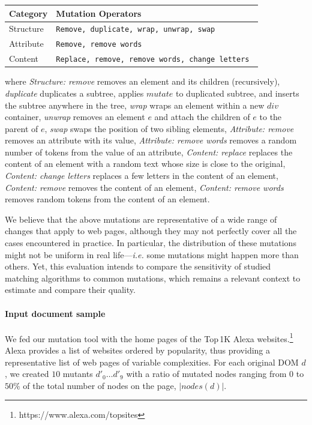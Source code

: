 \begin{center}
    \begin{table}[h]
    \begin{tabular}{l|l}
    \hline
    Category  & Mutation Operators                       \\ \hline
    Structure & \tt Remove, duplicate, wrap, unwrap, swap    \\
    Attribute & \tt Remove, remove words                     \\
    Content   & \tt Replace, remove, remove words, change letters \\ \hline
    \end{tabular}
    \end{table}
\end{center}
where
\textit{Structure: remove} removes an element and its children (recursively), 
\textit{duplicate} duplicates a subtree, applies $mutate$ to duplicated subtree, and inserts the subtree anywhere in the tree,
\textit{wrap} wraps an element within a new $div$ container,
\textit{unwrap} removes an element $e$ and attach the children of $e$ to the parent of $e$,
\textit{swap} swaps the position of two sibling elements,
\textit{Attribute: remove} removes an attribute with its value,
\textit{Attribute: remove words} removes a random number of tokens from the value of an attribute,
\textit{Content: replace} replaces the content of an element with a random text whose size is close to the original,
\textit{Content: change letters} replaces a few letters in the content of an element,
\textit{Content: remove} removes the content of an element,
\textit{Content: remove words} removes random tokens from the content of an element.

We believe that the above mutations are representative of a wide range of changes that apply to web pages, although they may not perfectly cover all the cases encountered in practice.
In particular, the distribution of these mutations might not be uniform in real life---\emph{i.e.} some mutations might happen more than others.
Yet, this evaluation intends to compare the sensitivity of studied matching algorithms to common mutations, which remains a relevant context to estimate and compare their quality.

\paragraph{Input document sample}
We fed our mutation tool with the home pages of the Top\,1K Alexa websites.\footnote{https://www.alexa.com/topsites}
Alexa provides a list of websites ordered by popularity, thus providing a representative list of web pages of variable complexities.
For each original DOM $d$, we created $10$ mutants $d'_0\dots d'_9$ with a ratio of mutated nodes ranging from $0$ to $50\%$ of the total number of nodes on the page, $|nodes(d)|$.

